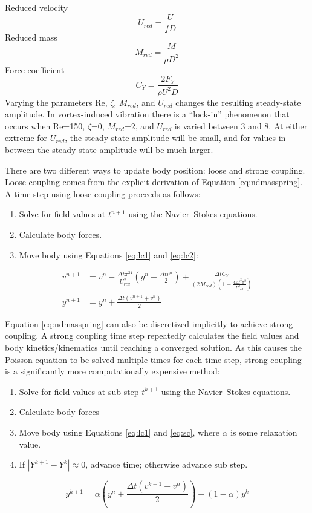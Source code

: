 Reduced velocity
\begin{equation}
U_{red}=\frac{U}{fD}\label{eq:reduced velocity}
\end{equation}
Reduced mass
\begin{equation}
M_{red}=\frac{M}{\rho D^2}\label{eq:reduced mass}
\end{equation}
Force coefficient
\begin{equation}
C_Y=\frac{2F_Y}{\rho U^2 D}\label{eq:force coefficient}
\end{equation}
Varying the parameters Re, $\zeta$, $M_{red}$, and $U_{red}$ changes the resulting steady-state amplitude. 
In vortex-induced vibration there is a ``lock-in'' phenomenon that occurs when Re=150, $\zeta$=0, $M_{red}$=2, and $U_{red}$ is varied between 3 and 8. 
At either extreme for $U_{red}$, the steady-state amplitude will be small, and for values in between the steady-state amplitude will be much larger. 

There are two different ways to update body position: loose and strong coupling. 
Loose coupling comes from the explicit derivation of Equation \eqref{eq:ndmasspring}.
A time step using loose coupling proceeds as follows:
\begin{enumerate}
	\item Solve for field values at $t^{n+1}$ using the Navier--Stokes equations.
	\item Calculate body forces.
	\item Move body using Equations \eqref{eq:lc1} and \eqref{eq:lc2}:
\end{enumerate}
\begin{align}
v^{n+1} &= v^n-\frac{\Delta t\pi^24}{U_{red}^2}\left(y^n+\frac{\Delta tv^n}{2}\right) + \frac{\Delta tC_Y}{\left(2M_{red}\right)\left(1+\frac{4\Delta t^2\pi^2}{U_{red}^2}\right)} \label{eq:lc1} \\
y^{n+1} &= y^n +\frac{\Delta t\left(v^{n+1}+v^n\right)}{2}\; \label{eq:lc2}
\end{align}

Equation \eqref{eq:ndmasspring} can also be discretized implicitly to achieve strong coupling.
A strong coupling time step repeatedly calculates the field values and body kinetics/kinematics until reaching a converged solution.
As this causes the Poisson equation to be solved multiple times for each time step, strong coupling is a significantly more computationally expensive method:
\begin{enumerate}
	\item Solve for field values at sub step $t^{k+1}$ using the Navier--Stokes equations.
	\item Calculate body forces
	\item Move body using Equations \eqref{eq:lc1} and \eqref{eq:sc}, where $\alpha$ is some relaxation value.
	\item If $|Y^{k+1}-Y^k| \approx 0$, advance time; otherwise advance sub step.
\end{enumerate}
\begin{equation}
y^{k+1} = \alpha \left(y^n+\frac{\Delta t\left(v^{k+1}+v^n\right)}{2}\right) +\left(1-\alpha\right)y^k\label{eq:sc}
\end{equation}

